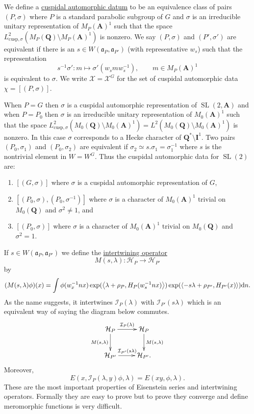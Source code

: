 \documentclass[11pt]{amsart}
\def\A{\mathbf A}
\def\I{\mathbf I}
\def\Q{\mathbf Q}
\def\HHH{\mathcal H}
\def\III{\mathcal I}
\def\XXX{\mathcal X}
\def\aaa{\mathfrak a}
\def\d{\text d}
\def\bs{\setminus}
\def\cusp{\text{cusp}}
\def\Ltwo{L^2}
\def\sl{\operatorname{SL}}
\def\sprod#1#2{\left\langle #1 , #2 \right\rangle}  %
\theoremstyle{remark}
\begin{document}
We define a \underline{cuspidal automorphic datum} to be an equivalence class of pairs $(P, \sigma)$ where $P$ is a standard parabolic subgroup of $G$ and $\sigma$ is an irreducible unitary representation of $M_P(\A)^1$ such that the space $\Ltwo_{\cusp, \sigma} (M_P(\Q)\bs M_P(\A)^1)$ is nonzero. We say $(P, \sigma)$ and $(P', \sigma')$ are equivalent if there is an $s \in W(\aaa_P, \aaa_{P'})$ (with representative $w_s$) such that the representation 
\[ s^{-1}\sigma' : m \mapsto \sigma'(w_s m w_s^{-1}), \qquad m \in M_P(\A)^1 \]
is equivalent to $\sigma$. We write $\XXX = \XXX^G$ for the set of cuspidal automorphic data $\chi = [(P, \sigma)]$. 

When $P=G$ then $\sigma$ is a cuspidal automorphic representation of $\sl(2,\A)$ and when $P=P_0$ then $\sigma$ is an irreducible unitary representation of $M_0(\A)^1$ such that the space $\Ltwo_{\text{cusp}, \sigma}(M_0(\Q)\bs M_0(\A)^1) = \Ltwo(M_0(\Q)\bs M_0(\A)^1)$ is nonzero. In this case $\sigma$ corresponds to a Hecke character of $\Q^*\bs \I^1$. Two pairs $(P_0, \sigma_1)$ and $(P_0, \sigma_2)$ are equivalent if $\sigma_2 \simeq s.\sigma_1 = \sigma_1^{-1}$ where $s$ is the nontrivial element in $W = W^G$. Thus the cuspidal automorphic data for $\sl(2)$ are:
\begin{enumerate}
\item $[(G, \sigma)]$ where $\sigma$ is a cuspidal automorphic representation of $G$,
\item $[(P_0, \sigma), (P_0, \sigma^{-1})]$ where $\sigma$ is a character of $M_0(\A)^1$ trivial on $M_0(\Q)$ and $\sigma^2 \neq 1$, and
\item $[(P_0, \sigma)]$ where $\sigma$ is a character of $M_0(\A)^1$ trivial on $M_0(\Q)$ and $\sigma^2 = 1$.
\end{enumerate}

If $s \in W(\aaa_P, \aaa_{P'})$ we define the \underline{intertwining operator}
\[ M(s, \lambda) : \HHH_P \to \HHH_{P'} \]
by
\[ (M(s, \lambda)\phi)(x) = \int \phi(w_x^{-1}n x) \exp(\sprod{\lambda + \rho_P}{H_P(w_s^{-1}n x)})
				 \exp(\sprod{- s\lambda + \rho_{P'}}{H_{P'}(x)}) \d n. \]
As the name suggests, it intertwines $\III_P(\lambda)$ with $\III_{P'}(s\lambda)$ which is an equivalent way of saying the diagram below commutes. 
\[ \xymatrix{
	\HHH_P \ar[r]^{\III_P(\lambda)} \ar[d]_{M(s, \lambda)} & \HHH_P \ar[d]^{M(s, \lambda)} \\
	\HHH_{P'} \ar[r]^{\III_{P'}(s\lambda)} & \HHH_{P'}.
 } \]
Moreover,
\[ E(x, \III_P(\lambda, y)\phi, \lambda) = E(xy, \phi, \lambda). \]
These are the most important properties of Eisenstein series and intertwining operators. Formally they are easy to prove but to prove they converge and define meromorphic functions is very difficult.
\end{document}
